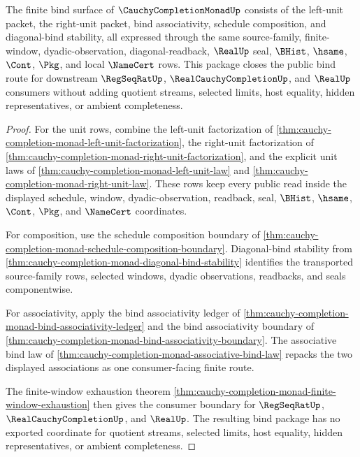 \begin{theorem}
\label{thm:cauchy-completion-monad-bind-closure-package}
The finite bind surface of $\CauchyCompletionMonadUp$ consists of the left-unit packet, the right-unit packet, bind associativity, schedule composition, and diagonal-bind stability, all expressed through the same source-family, finite-window, dyadic-observation, diagonal-readback, $\RealUp$ seal, $\BHist$, $\hsame$, $\Cont$, $\Pkg$, and local $\NameCert$ rows. This package closes the public bind route for downstream $\RegSeqRatUp$, $\RealCauchyCompletionUp$, and $\RealUp$ consumers without adding quotient streams, selected limits, host equality, hidden representatives, or ambient completeness.
\end{theorem}
\begin{proof}
For the unit rows, combine the left-unit factorization of \autoref{thm:cauchy-completion-monad-left-unit-factorization}, the right-unit factorization of \autoref{thm:cauchy-completion-monad-right-unit-factorization}, and the explicit unit laws of \autoref{thm:cauchy-completion-monad-left-unit-law} and \autoref{thm:cauchy-completion-monad-right-unit-law}. These rows keep every public read inside the displayed schedule, window, dyadic-observation, readback, seal, $\BHist$, $\hsame$, $\Cont$, $\Pkg$, and $\NameCert$ coordinates.

For composition, use the schedule composition boundary of \autoref{thm:cauchy-completion-monad-schedule-composition-boundary}. Diagonal-bind stability from \autoref{thm:cauchy-completion-monad-diagonal-bind-stability} identifies the transported source-family rows, selected windows, dyadic observations, readbacks, and seals componentwise.

For associativity, apply the bind associativity ledger of \autoref{thm:cauchy-completion-monad-bind-associativity-ledger} and the bind associativity boundary of \autoref{thm:cauchy-completion-monad-bind-associativity-boundary}. The associative bind law of \autoref{thm:cauchy-completion-monad-associative-bind-law} repacks the two displayed associations as one consumer-facing finite route.

The finite-window exhaustion theorem \autoref{thm:cauchy-completion-monad-finite-window-exhaustion} then gives the consumer boundary for $\RegSeqRatUp$, $\RealCauchyCompletionUp$, and $\RealUp$. The resulting bind package has no exported coordinate for quotient streams, selected limits, host equality, hidden representatives, or ambient completeness.
\end{proof}

